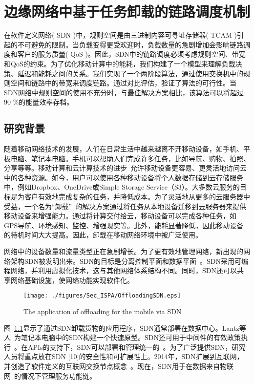 \chapter{边缘网络中基于任务卸载的链路调度机制}

在软件定义网络( SDN )中，规则空间是由三进制内容可寻址存储器( TCAM )引起的不可避免的限制。当负载变得更受欢迎时，负载数量的急剧增加会影响链路调度和客户的服务质量( QoS )。因此，SDN中的链路调度必须考虑规则空间、带宽和QoS的约束。为了优化移动计算中的能耗，我们构建了一个模型来理解负载决策、延迟和能耗之间的关系。我们实现了一个两阶段算法，通过使用交换机中的规则空间和链路中的带宽来调度链路。通过对比评估，验证了算法的可行性。当SDN网络中规则空间的使用不充分时，与最佳解决方案相比，该算法可以将超过90 \%的能量效率存档。

\section{研究背景}

随着移动网络技术的发展，人们在日常生活中越来越离不开移动设备，如手机、平板电脑、笔记本电脑。手机可以帮助人们完成许多任务，比如导航、购物、拍照、分享等等。移动计算和云计算技术的进步~\cite{Lee:2013fj, Linthicum:2017vv}允许移动设备更容易、更灵活地访问云中的各种资源。如今，用户可以使用各种移动设备将个人数据存储到云存储服务中，例如Dropbox、OneDrive或Simple Storage Service（S3）。大多数云服务的目标是为客户有效地完成复杂的任务，并降低成本。为了灵活地从更多的云服务器中受益，一个名为“卸载”~\cite{Kumar:2013dq}的解决方案通过将任务从本地设备迁移到云服务器来提供移动设备来增强能力。通过将计算交付给云，移动设备可以完成各种任务，如GPS导航、环境感知、监控、增强现实等。此外，能耗显著降低，因此移动设备的待机时间大大提高。因此，卸载在移动网络环境中被广泛使用。

网络中的设备数量和流量类型正在急剧增长。为了更有效地管理网络，新出现的网络架构SDN被发明出来。SDN的目标是分离控制平面和数据平面~\cite{Committee:2012un}。SDN采用可编程网络，并利用虚拟化技术，这与其他网络体系结构不同。同时，SDN还可以共享网络基础设施，使网络功能实现软件化。

\begin{figure}[!h]
  \centering
  \texttt{[image: ./figures/Sec\_ISPA/OffloadingSDN.eps]}
  \vspace{-1em}
  \caption{The application of offloading for the mobile via SDN}
  \vspace{-1em}
  \label{fig_OffloadingSDN}
\end{figure}

图~\ref{fig_OffloadingSDN}显示了通过SDN卸载货物的应用程序，SDN通常部署在数据中心。Lantz等人~\cite{Lantz:2010:NLR:1868447.1868466}为笔记本电脑中的SDN构建一个快速原型。SDN还可用于中间件的有效政策执行~\cite{Qazi:2013:SMP:2486001.2486022}。在APIs的支持下，SDN可以部署和管理统一的~\cite{Ferguson:2013:PNA:2486001.2486003}。为了广泛提供SDN，研究人员将重点放在SDN [10]的安全性和可扩展性上。2014年，SDN扩展到互联网，并创造了软件定义的互联网交换节点概念~\cite{Gupta:2014:SSD:2619239.2626300}。现在，SDN用于在数据来自物联网~\cite{Morabito:2017:FBS:3094405.3094413}的情况下管理服务功能链。

